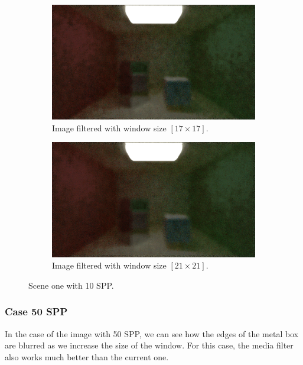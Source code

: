 \documentclass[titlepage,12pt]{report}
\begin{document}
\begin{figure}[H]
	\begin{subfigure}{.48\textwidth}
		\centering
		\includegraphics[scale=0.2]{media/median/cornell_normal_10_median_filter_17.png}
		\caption{Image filtered with window size $[17 \times 17]$.}
		\label{median_filter_3}
	\end{subfigure}
	\begin{subfigure}{.48\textwidth}
		\centering
		\includegraphics[scale=0.2]{media/median/cornell_normal_10_median_filter_21.png}
		\caption{Image filtered with window size $[21 \times 21]$.}
		\label{median_filter_4}
	\end{subfigure}
	\medskip
	\caption{Scene one with 10 SPP.}
	\label{median_filter_01}
\end{figure}

\subsubsection{Case 50 SPP}

In the case of the image with 50 SPP, we can see how the edges of the metal box are blurred as we increase the size of the window. For this case, the media filter also works much better than the current one.
\end{document}
